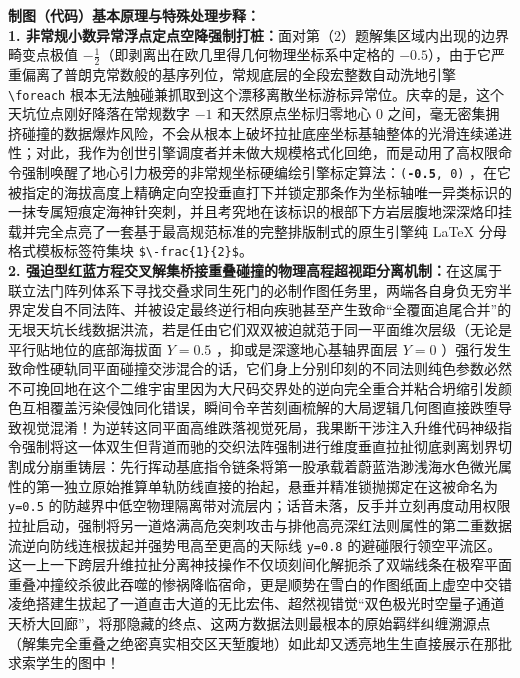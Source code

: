 \vspace{0.6cm}

{\small\color{blue!70!black}
\textbf{制图（代码）基本原理与特殊处理步释：}\\
\textbf{1. 非常规小数异常浮点定点空降强制打桩：}面对第（2）题解集区域内出现的边界畸变点极值 $-\frac{1}{2}$（即剥离出在欧几里得几何物理坐标系中定格的 $-0.5$），由于它严重偏离了普朗克常数般的基序列位，常规底层的全段宏整数自动洗地引擎 \texttt{\textbackslash foreach} 根本无法触碰兼抓取到这个漂移离散坐标游标异常位。庆幸的是，这个天坑位点刚好降落在常规数字 $-1$ 和天然原点坐标归零地心 $0$ 之间，毫无密集拥挤碰撞的数据爆炸风险，不会从根本上破坏拉扯底座坐标基轴整体的光滑连续递进性；对此，我作为创世引擎调度者并未做大规模格式化回绝，而是动用了高权限命令强制唤醒了地心引力极旁的非常规坐标硬编绘引擎标定算法：\texttt{(\textbf{-0.5}, 0)} ，在它被指定的海拔高度上精确定向空投垂直打下并锁定那条作为坐标轴唯一异类标识的一抹专属短痕定海神针突刺，并且考究地在该标识的根部下方岩层腹地深深烙印挂载并完全点亮了一套基于最高规范标准的完整排版制式的原生引擎纯 LaTeX 分母格式模板标签符集块 \texttt{\$\textbackslash -frac\{1\}\{2\}\$}。\\
\textbf{2. 强迫型红蓝方程交叉解集桥接重叠碰撞的物理高程超视距分离机制：}在这属于联立法门阵列体系下寻找交叠求同生死门的必制作图任务里，两端各自身负无穷半界定发自不同法阵、并被设定最终逆行相向疾驰甚至产生致命“全覆面追尾合并”的无垠天坑长线数据洪流，若是任由它们双双被迫就范于同一平面维次层级（无论是平行贴地位的底部海拔面 $Y=0.5$ ，抑或是深邃地心基轴界面层 $Y=0$ ）强行发生致命性硬轨同平面碰撞交涉混合的话，它们身上分别印刻的不同法则纯色参数必然不可挽回地在这个二维宇宙里因为大尺码交界处的逆向完全重合并粘合坍缩引发颜色互相覆盖污染侵蚀同化错误，瞬间令辛苦刻画梳解的大局逻辑几何图直接跌堕导致视觉混淆！为逆转这同平面高维跌落视觉死局，我果断干涉注入升维代码神级指令强制将这一体双生但背道而驰的交织法阵强制进行维度垂直拉扯彻底剥离划界切割成分崩重铸层：先行挥动基底指令链条将第一股承载着蔚蓝浩渺浅海水色微光属性的第一独立原始推算单轨防线直接的抬起，悬垂并精准锁抛掷定在这被命名为 \texttt{y=0.5} 的防越界中低空物理隔离带对流层内；话音未落，反手并立刻再度动用权限拉扯启动，强制将另一道烙满高危突刺攻击与排他高亮深红法则属性的第二重数据流逆向防线连根拔起并强势甩高至更高的天际线 \texttt{y=0.8} 的避碰限行领空平流区。这一上一下跨层升维拉扯分离神技操作不仅顷刻间化解扼杀了双端线条在极窄平面重叠冲撞绞杀彼此吞噬的惨祸降临宿命，更是顺势在雪白的作图纸面上虚空中交错凌绝搭建生拔起了一道直击大道的无比宏伟、超然视错觉“双色极光时空量子通道天桥大回廊”，将那隐藏的终点、这两方数据法则最根本的原始羁绊纠缠溯源点（解集完全重叠之绝密真实相交区天堑腹地）如此却又透亮地生生直接展示在那批求索学生的图中！
}
\newpage



